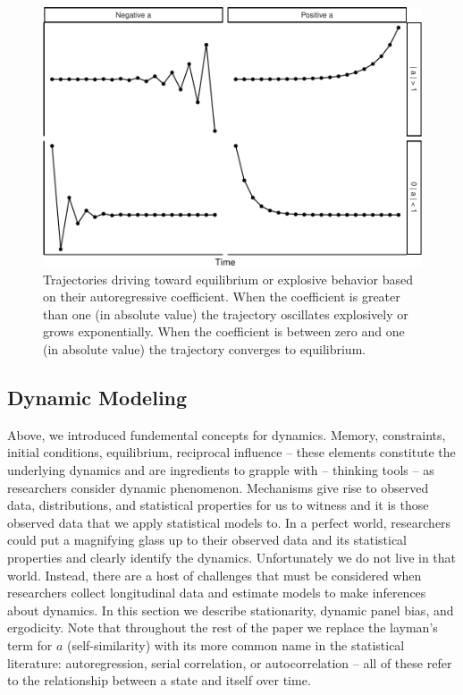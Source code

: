 \documentclass[english,,man]{apa6}
\begin{document}
\begin{figure}
\centering
\includegraphics{figs/unnamed-chunk-9-1.pdf}
\caption{\label{fig:unnamed-chunk-9}Trajectories driving toward equilibrium or explosive behavior based on their autoregressive coefficient. When the coefficient is greater than one (in absolute value) the trajectory oscillates explosively or grows exponentially. When the coefficient is between zero and one (in absolute value) the trajectory converges to equilibrium.\label{dynamics_plot}}
\end{figure}

\hypertarget{dynamic-modeling}{%
\subsection{Dynamic Modeling}\label{dynamic-modeling}}

Above, we introduced fundemental concepts for dynamics. Memory, constraints, initial conditions, equilibrium, reciprocal influence -- these elements constitute the underlying dynamics and are ingredients to grapple with -- thinking tools -- as researchers consider dynamic phenomenon. Mechanisms give rise to observed data, distributions, and statistical properties for us to witness and it is those observed data that we apply statistical models to. In a perfect world, researchers could put a magnifying glass up to their observed data and its statistical properties and clearly identify the dynamics. Unfortunately we do not live in that world. Instead, there are a host of challenges that must be considered when researchers collect longitudinal data and estimate models to make inferences about dynamics. In this section we describe stationarity, dynamic panel bias, and ergodicity. Note that throughout the rest of the paper we replace the layman's term for \(a\) (self-similarity) with its more common name in the statistical literature: autoregression, serial correlation, or autocorrelation -- all of these refer to the relationship between a state and itself over time.
\end{document}
